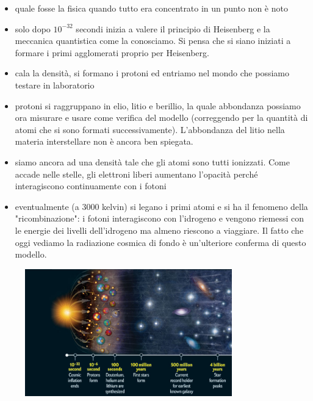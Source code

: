 \documentclass[a4paper,11pt]{article}
\begin{document}
\begin{itemize}
    \item quale fosse la fisica quando tutto era concentrato in un punto non è noto
    \item solo dopo $10^{-32}$ secondi inizia a valere il principio di Heisenberg e la meccanica quantistica come la conosciamo. Si pensa che si siano iniziati a formare i primi agglomerati proprio per Heisenberg.
    \item cala la densità, si formano i protoni ed entriamo nel mondo che possiamo testare in laboratorio
    \item protoni si raggruppano in elio, litio e berillio, la quale abbondanza possiamo ora misurare e usare come verifica del modello (correggendo per la quantità di atomi che si sono formati successivamente). L'abbondanza del litio nella materia interstellare non è ancora ben spiegata.
    \item siamo ancora ad una densità tale che gli atomi sono tutti ionizzati. Come accade nelle stelle, gli elettroni liberi aumentano l'opacità perché interagiscono continuamente con i fotoni
    \item eventualmente (a 3000 kelvin) si legano i primi atomi e si ha il fenomeno della "ricombinazione": i fotoni interagiscono con l'idrogeno e vengono riemessi con le energie dei livelli dell'idrogeno ma almeno riescono a viaggiare. Il fatto che oggi vediamo la radiazione cosmica di fondo è un'ulteriore conferma di questo modello.
\end{itemize}
\begin{figure}[h!!]
        \centering
        \includegraphics[width=0.8\textwidth]{immagini16dic/bigbang.png}
        \label{}
    \end{figure}
\end{document}
